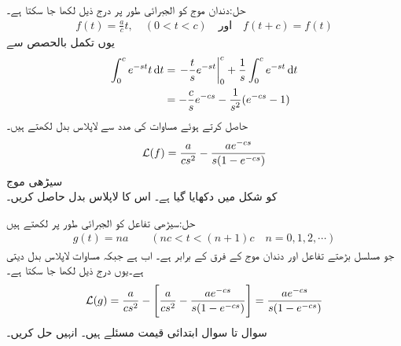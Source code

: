 حل:دندان موج کو الجبرائی طور پر درج ذیل لکھا جا سکتا ہے۔
\begin{align*}
f(t)=\frac{a}{c}t, \quad (0<t<c)\quad \text{اور}\quad f(t+c)=f(t)
\end{align*}
یوں تکمل بالحصص سے 
\begin{align*}
\int_{0}^{c} e^{-st} t\dif t&=\left.-\frac{t}{s}e^{-st} \right |_{0}^{c}+\frac{1}{s}\int_{0}^{c}e^{-st}\dif t\\
&=-\frac{c}{s}e^{-cs}-\frac{1}{s^2}(e^{-cs}-1)
\end{align*}
حاصل کرتے ہوئے  مساوات  کی مدد سے لاپلاس بدل لکھتے ہیں۔
\begin{align}\label{مساوات_لاپلاس_دندان}
\mathcal{L}(f)=\frac{a}{cs^2}-\frac{ae^{-cs}}{s(1-e^{-cs})}
\end{align}
\quad سیڑھی موج\\
 کو شکل  میں دکھایا گیا ہے۔ اس کا لاپلاس بدل حاصل کریں۔

حل:سیڑھی تفاعل کو الجبرائی طور پر لکھتے ہیں
\begin{align*}
g(t)=na \quad \quad (nc<t<(n+1)c\quad n=0,1,2,\cdots)
\end{align*}
جو مسلسل بڑھتے تفاعل  اور دندان موج  کے فرق   کے برابر ہے۔ اب  ہے جبکہ مساوات  لاپلاس بدل  دیتی ہے۔یوں درج ذیل لکھا جا سکتا ہے۔
\begin{align}
\mathcal{L}(g)=\frac{a}{cs^2}-\left[\frac{a}{cs^2}-\frac{ae^{-cs}}{s(1-e^{-cs})}\right]=\frac{ae^{-cs}}{s(1-e^{-cs})}
\end{align}
سوال  تا سوال  ابتدائی قیمت مسئلے ہیں۔ انہیں حل کریں۔

